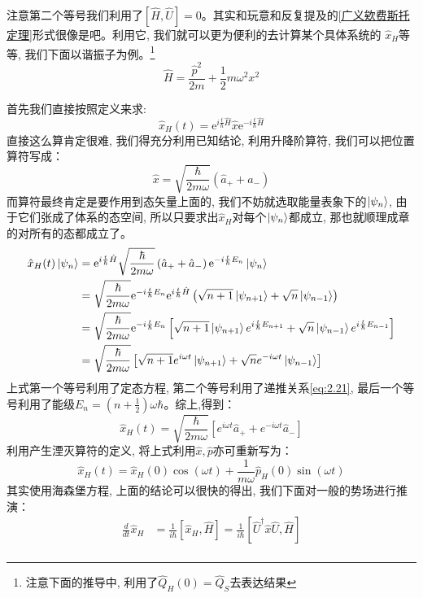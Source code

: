 注意第二个等号我们利用了$\left[\hat{H},\hat{U}\right]=0$。其实和玩意和反复提及的\ref{广义欸费斯托定理}形式很像是吧。利用它, 我们就可以更为便利的去计算某个具体系统的
$\hat{x}_H$等等, 我们下面以谐振子为例。\footnote{注意下面的推导中, 利用了$\hat{Q}_H(0)=\hat{Q}_S$去表达结果}
\[\hat{H}=\frac{\hat{p}^2}{2m}+\frac{1}{2}m\omega^2x^2\]
\begin{thinknote}
    首先我们直接按照定义来求:
    \[\hat{x}_H(t)=\mathrm e^{i\frac{t}{\hbar}\hat{H}}\hat{x}\mathrm e^{-i\frac{t}{\hbar}\hat{H}}\]
    直接这么算肯定很难, 我们得充分利用已知结论, 利用升降阶算符, 我们可以把位置算符写成：
    \[\hat{x}=\sqrt{\frac{\hbar}{2m\omega}}\left(\hat{a}_++\hat{a}_-\right)\]
    而算符最终肯定是要作用到态矢量上面的, 我们不妨就选取能量表象下的$\ket{\psi_n}$, 由于它们张成了体系的态空间, 所以只要求出$\hat{x}_H$对每个$\ket{\psi_n}$都成立, 那也就顺理成章的对所有的态都成立了。
    \begin{align*}
        \hat{x}_H(t)\ket{\psi_n}&=\mathrm e^{i\frac{t}{\hbar}\hat{H}}\sqrt{\frac{\hbar}{2m\omega}}\left(\hat{a}_++\hat{a}_-\right)\mathrm e^{-i\frac{t}{\hbar}E_n}\ket{\psi_n}\\
        &=\sqrt{\frac{\hbar}{2m\omega}}\mathrm e^{-i\frac{t}{\hbar}E_n}\mathrm e^{i\frac{t}{\hbar}\hat{H}}\left(\sqrt{n+1}\ket{\psi_{n+1}}+\sqrt{n}\ket{\psi_{n-1}}\right)\\
        &=\sqrt{\frac{\hbar}{2m\omega}}\mathrm e^{-i\frac{t}{\hbar}E_n}\left[\sqrt{n+1}\ket{\psi_{n+1}}e^{i\frac{t}{\hbar}E_{n+1}}+\sqrt{n}\ket{\psi_{n-1}}e^{i\frac{t}{\hbar}E_{n-1}}\right]\\
        &=\sqrt{\frac{\hbar}{2 m \omega}}\left[\sqrt{n+1} e^{i \omega t} \ket{\psi_{n+1}}+\sqrt{n} e^{-i \omega t} \ket{\psi_{n-1}}\right]
    \end{align*}
    上式第一个等号利用了定态方程, 第二个等号利用了递推关系\ref{eq:2.21}, 最后一个等号利用了能级$E_n=(n+\frac{1}{2})\omega\hbar$。综上,得到：
    \[\hat{x}_{H}(t)=\sqrt{\frac{\hbar}{2 m \omega}}\left[e^{i \omega t} \hat{a}_{+}+e^{-i \omega t} \hat{a}_{-}\right]\]
    利用产生湮灭算符的定义, 将上式利用$\hat{x},\hat{p}$亦可重新写为：
    \[\hat{x}_{H}(t)=\hat{x}_{H}(0) \cos (\omega t)+\frac{1}{m \omega} \hat{p}_{H}(0) \sin (\omega t)\]
    其实使用海森堡方程, 上面的结论可以很快的得出, 我们下面对一般的势场进行推演：
    \begin{equation}
        \begin{aligned}
            \frac{d}{d t} \hat{x}_{H} &=\frac{1}{i \hbar}\left[\hat{x}_{H}, \hat{H}\right]=\frac{1}{i \hbar}\left[\hat{U}^{\dagger} \hat{x} \hat{U}, \hat{H}\right] \\

\end{aligned}
\end{equation}
\end{thinknote}
